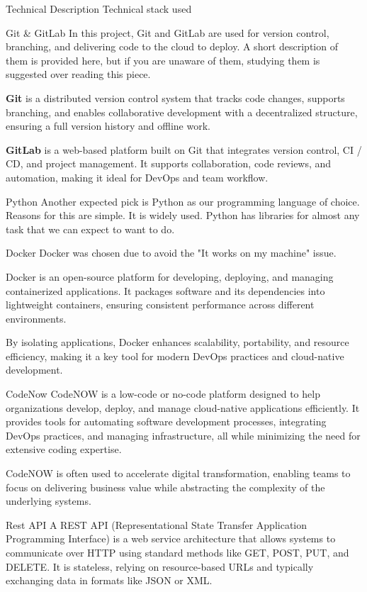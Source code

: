 \chap Technical Description
\sec Technical stack used

\secc Git \& GitLab
In this project, Git and GitLab are used for version control, branching, and delivering code to the cloud to deploy. A short description of them is provided here, but if you are unaware of them, studying them is suggested over reading this piece.

{\bf Git} is a distributed version control system that tracks code changes, supports branching, and enables collaborative development with a decentralized structure, ensuring a full version history and offline work.

{\bf GitLab} is a web-based platform built on Git that integrates version control, CI / CD, and project management. It supports collaboration, code reviews, and automation, making it ideal for DevOps and team workflow.

\secc Python
Another expected pick is Python as our programming language of choice. Reasons for this are simple. It is widely used. Python has libraries for almost any task that we can expect to want to do.

\secc Docker
Docker was chosen due to avoid the "It works on my machine" issue.

Docker is an open-source platform for developing, deploying, and managing containerized applications. It packages software and its dependencies into lightweight containers, ensuring consistent performance across different environments.

By isolating applications, Docker enhances scalability, portability, and resource efficiency, making it a key tool for modern DevOps practices and cloud-native development.

\secc CodeNow
CodeNOW is a low-code or no-code platform designed to help organizations develop, deploy, and manage cloud-native applications efficiently. It provides tools for automating software development processes, integrating DevOps practices, and managing infrastructure, all while minimizing the need for extensive coding expertise.

CodeNOW is often used to accelerate digital transformation, enabling teams to focus on delivering business value while abstracting the complexity of the underlying systems.

\secc Rest API
A REST API (Representational State Transfer Application Programming Interface) is a web service architecture that allows systems to communicate over HTTP using standard methods like GET, POST, PUT, and DELETE. It is stateless, relying on resource-based URLs and typically exchanging data in formats like JSON or XML.

